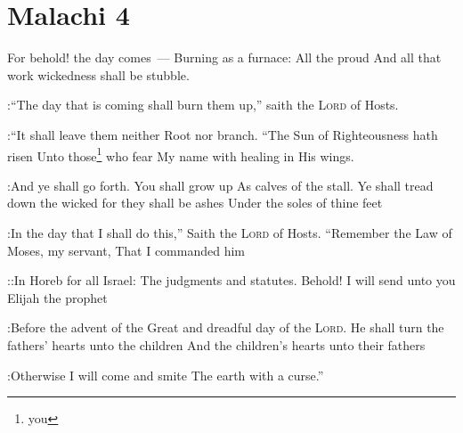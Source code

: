 \section{Malachi 4}\label{Malachi 4}
\begin{enumerate}[align=center]
     For behold! the day comes~--- Burning as a furnace: All the proud And all that work wickedness shall be stubble.

:``The day that is coming shall burn them up,'' saith the \textsc{Lord} of Hosts.

:``It shall leave them neither Root nor branch.%
     ``The Sun of Righteousness hath risen Unto those\footnote{you} who fear My name with healing in His wings.

:And ye shall go forth. You shall grow up As calves of the stall.%
     Ye shall tread down the wicked for they shall be ashes Under the soles of thine feet

:In the day that I shall do this,'' Saith the \textsc{Lord} of Hosts.%
     ``Remember the Law of Moses, my servant, That I commanded him

::In Horeb for all Israel: The judgments and statutes.%
     Behold! I will send unto you Elijah the prophet

:Before the advent of the Great and dreadful day of the \textsc{Lord}.%
     He shall turn the fathers' hearts unto the children And the children's hearts unto their fathers

:Otherwise I will come and smite The earth with a curse.''%
\end{enumerate}
